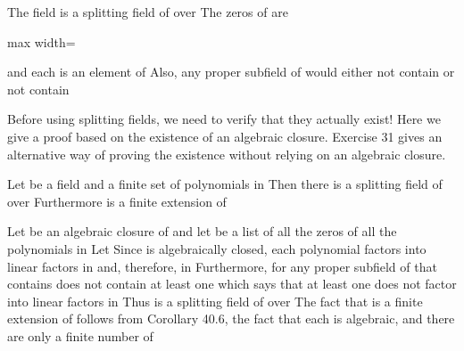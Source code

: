 \documentclass[11pt,oneside]{article}
\begin{document}
\begin{BookBody}

 The field  is a splitting field of  over  The zeros of  are

\begin{center}\begin{adjustbox}{max width=\linewidth}\end{adjustbox}\end{center}

and each is an element of  Also, any proper subfield of  would either not contain  or not contain  \BookEnd{\blacktriangle}

Before using splitting fields, we need to verify that they actually exist! Here we give a proof based on the existence of an algebraic closure. Exercise 31 gives an alternative way of proving the existence without relying on an algebraic closure.

 Let  be a field and  a finite set of polynomials in  Then there is a splitting field  of  over  Furthermore  is a finite extension of 

 Let  be an algebraic closure of  and let  be a list of all the zeros of all the polynomials in  Let  Since  is algebraically closed, each polynomial  factors into linear factors in  and, therefore, in  Furthermore, for any proper subfield  of  that contains  does not contain at least one  which says that at least one  does not factor into linear factors in  Thus  is a splitting field of  over  The fact that  is a finite extension of  follows from Corollary 40.6, the fact that each  is algebraic, and there are only a finite number of \BookEnd{\blacklozenge}


\end{BookBody}
\end{document}
